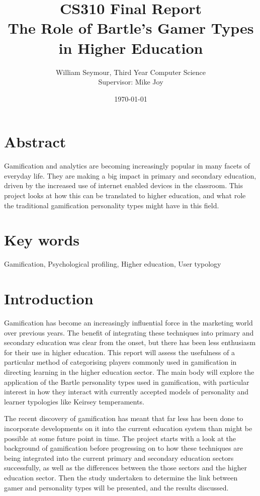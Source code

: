 \documentclass[12pt]{article}
\title{CS310 Final Report \\ The Role of Bartle's Gamer Types in Higher Education}
\author{William Seymour, Third Year Computer Science \\ Supervisor: Mike Joy}
\date{\today}
\begin{document}
\maketitle
\clearpage
\tableofcontents
\listoffigures
\listoftables

\section{Abstract}
Gamification and analytics are becoming increasingly popular in many facets of everyday life. They are making a big impact in primary and secondary education, driven by the increased use of internet enabled devices in the classroom. This project looks at how this can be translated to higher education, and what role the traditional gamification personality types might have in this field.

\section{Key words}
Gamification, Psychological profiling, Higher education, User typology

\section{Introduction}
Gamification has become an increasingly influential force in the marketing world over previous years. The benefit of integrating these techniques into primary and secondary education was clear from the onset, but there has been less enthusiasm for their use in higher education. This report will assess the usefulness of a particular method of categorising players commonly used in gamification in directing learning in the higher education sector. The main body will explore the application of the Bartle personality types used in gamification, with particular interest in how they interact with currently accepted models of personality and learner typologies like Keirsey temperaments.

The recent discovery of gamification has meant that far less has been done to incorporate developments on it into the current education system than might be possible at some future point in time. The project starts with a look at the background of gamification before progressing on to how these techniques are being integrated into the current primary and secondary education sectors successfully, as well as the differences between the those sectors and the higher education sector. Then the study undertaken to determine the link between gamer and personality types will be presented, and the results discussed.
\end{document}
